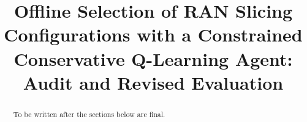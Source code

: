 \documentclass[conference]{IEEEtran}
\begin{document}
\title{Offline Selection of RAN Slicing Configurations with a Constrained Conservative Q-Learning Agent: Audit and Revised Evaluation}
\author{}
\maketitle

\begin{abstract}
To be written after the sections below are final.
\end{abstract}









\end{document}
